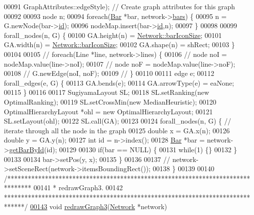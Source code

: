 \begin{DoxyCode}
00091     GraphAttributes::edgeStyle);  \textcolor{comment}{// Create graph attributes for this graph}
00092 
00093   node n;
00094   \textcolor{keywordflow}{foreach}(\hyperlink{class_bar}{Bar} *bar, network->\hyperlink{class_network_a7fe628f7de34a96235cbd3f2cee4aff2}{bars}) \{
00095     n = G.newNode(bar->\hyperlink{class_bar_a9dc5c6a6d44fe412ae34ef8a881b8dce}{id});
00096     nodeMap.insert(bar->\hyperlink{class_bar_a9dc5c6a6d44fe412ae34ef8a881b8dce}{id},n);
00097   \}
00098 
00099   forall\_nodes(n, G) \{
00100     GA.height(n) = \hyperlink{group___graphics_gaa334bbc93b3fde219840e95e23198b53}{Network::barIconSize};
00101     GA.width(n) = \hyperlink{group___graphics_gaa334bbc93b3fde219840e95e23198b53}{Network::barIconSize};
00102     GA.shape(n) = shRect;
00103   \}
00104 
00105 \textcolor{comment}{//  foreach(Line *line, network->lines) \{}
00106 \textcolor{comment}{//    node noI = nodeMap.value(line->noI);}
00107 \textcolor{comment}{//    node noF = nodeMap.value(line->noF);}
00108 \textcolor{comment}{//    G.newEdge(noI, noF);}
00109 \textcolor{comment}{//  \}}
00110 
00111   edge e;
00112   forall\_edges(e, G) \{
00113     GA.bends(e);
00114     GA.arrowType(e) = eaNone;
00115   \}
00116 
00117   SugiyamaLayout SL;
00118   SL.setRanking(\textcolor{keyword}{new} OptimalRanking);
00119   SL.setCrossMin(\textcolor{keyword}{new} MedianHeuristic);
00120   OptimalHierarchyLayout *ohl = \textcolor{keyword}{new} OptimalHierarchyLayout;
00121   SL.setLayout(ohl);
00122   SL.call(GA);
00123 
00124   forall\_nodes(n, G) \{  \textcolor{comment}{// iterate through all the node in the graph}
00125     \textcolor{keywordtype}{double} x = GA.x(n);
00126     \textcolor{keywordtype}{double} y = GA.y(n);
00127     \textcolor{keywordtype}{int} \textcolor{keywordtype}{id} = n->index();
00128     \hyperlink{class_bar}{Bar} *bar = network->\hyperlink{group___graphics_ga9c5806f5a0d236bb6d8abbdce62d9675}{getBarById}(\textcolor{keywordtype}{id});
00129 
00130     \textcolor{keywordflow}{if}(bar == NULL) \{
00131       \textcolor{keywordflow}{while}(1) \{\}
00132     \}
00133 
00134     bar->setPos(y, x);
00135   \}
00136 
00137 \textcolor{comment}{//  network->setSceneRect(network->itemsBoundingRect());}
00138 \}
00139 
00140 \textcolor{comment}{/*******************************************************************************}
00141 \textcolor{comment}{ * redrawGraph3.}
00142 \textcolor{comment}{ ******************************************************************************/}
\hypertarget{redraw_8cpp_source_l00143}{}\hyperlink{redraw_8h_a16e73f8fcaf10fb71fc8e7d719db919e}{00143} \textcolor{keywordtype}{void} \hyperlink{redraw_8cpp_a16e73f8fcaf10fb71fc8e7d719db919e}{redrawGraph3}(\hyperlink{class_network}{Network} *network)

\end{DoxyCode}
